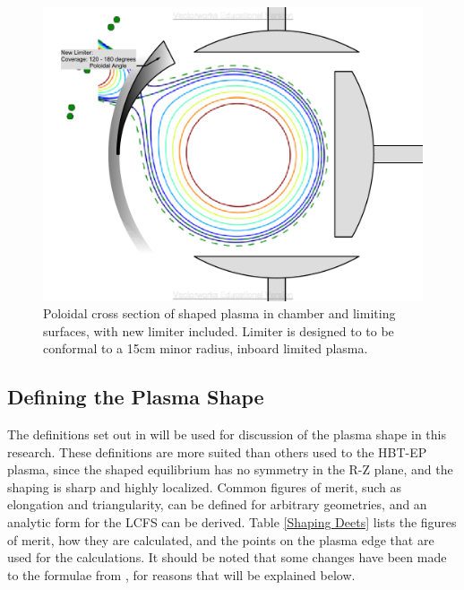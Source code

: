 \begin{figure}
\includegraphics[width = \textwidth]{./figures/Poloidal_Cross_Section_shaping_plus_new_limter_v2013.pdf}\begin{flushleft}
\caption{Poloidal cross section of shaped plasma in chamber and limiting surfaces, with new limiter included.  Limiter is designed to to be conformal to a 15cm minor radius, inboard limited plasma.}
\end{flushleft}
\label{new_limiters}
\end{figure}

\subsection{Defining the Plasma Shape}
The definitions set out in \cite{Luce} will be used for discussion of the plasma shape in this research.  These definitions are more suited than others used \cite{Boozer} to the HBT-EP plasma, since the shaped equilibrium has no symmetry in the R-Z plane, and the shaping is sharp and highly localized.  Common figures of merit, such as elongation and triangularity, can be defined for arbitrary geometries, and an analytic form for the LCFS can be derived.  Table \ref{Shaping Deets} lists the figures of merit, how they are calculated, and the points on the plasma edge that are used for the calculations.  It should be noted that some changes have been made to the formulae from \cite{Luce}, for reasons that will be explained below.

